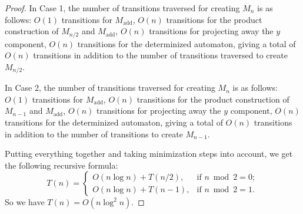 \documentclass[10pt,a4paper]{amsart}
\def\add{\text{add}}
\begin{document}
\begin{proof}
In Case 1, the number of transitions traversed for creating $M_n$ is as follows: $O(1)$ transitions for $M_{\add}$, $O(n)$ transitions for the product construction of $M_{n/2}$ and $M_{\add}$, $O(n)$ transitions for projecting away the $y$ component, $O(n)$ transitions for the determinized automaton, giving a total of $O(n)$ transitions in addition to the number of transitions traversed to create $M_{n/2}$.

In Case 2, the number of transitions traversed for creating $M_n$ is as follows: $O(1)$ transitions for $M_{\add}$, $O(n)$ transitions for the product construction of $M_{n-1}$ and $M_{\add}$, $O(n)$ transitions for projecting away the $y$ component, $O(n)$ transitions for the determinized automaton, giving a total of $O(n)$ transitions in addition to the number of transitions to create $M_{n-1}$.

Putting everything together and taking minimization steps into account, we get the following recursive formula:
\[ T(n) = 
\begin{cases}
    O(n \log n) + T(n/2), & \text{if $n \bmod 2 = 0$}; \\
    O(n \log n) + T(n-1), & \text{if $n \bmod 2 = 1$}.
\end{cases}
\]
So we have $T(n) = O(n\log^2 n)$.    
\end{proof}
\end{document}
